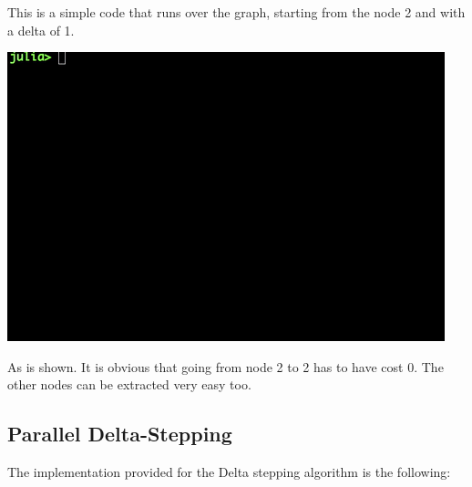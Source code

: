 \documentclass[letterpaper,10pt,english]{sphinxmanual}
\begin{document}
This is a simple code that runs over the graph, starting from the node 2 and with a delta of 1.

\includegraphics{deltastep.gif}

As is shown. It is obvious that going from node 2 to 2 has to have cost 0. The other nodes can be extracted very easy too.


\subsection{Parallel Delta-Stepping}
\label{Algorithm:parallel-delta-stepping}
The implementation provided for the Delta stepping algorithm is the following:
\end{document}
